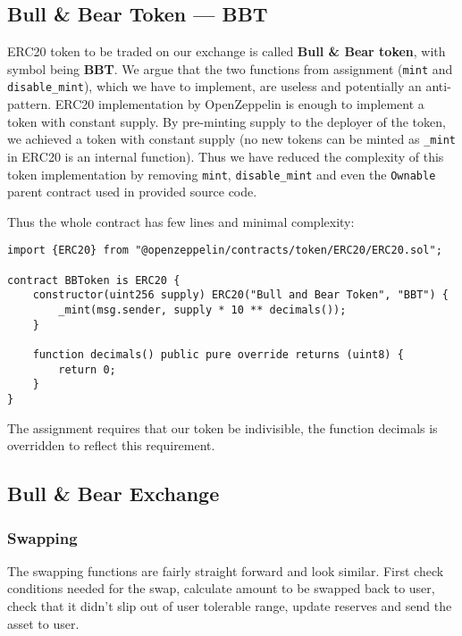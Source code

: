 \documentclass[11pt,a4paper]{article}
\begin{document}
\subsection*{Bull \& Bear Token --- BBT}

ERC20 token to be traded on our exchange is called \textbf{Bull \& Bear token},
with symbol being \textbf{BBT}. We argue that the two functions from assignment
(\texttt{mint} and \texttt{disable\_mint}), which we have to implement, are
useless and potentially an anti-pattern. ERC20 implementation by
OpenZeppelin is enough to implement a token with constant supply.
By pre-minting supply to the deployer of the token, we achieved a token
with constant supply (no new tokens can be minted as \texttt{\_mint} in ERC20
is an internal function\cite{openzeppelinERC20}). Thus we have reduced the
complexity of this token implementation by removing \texttt{mint}, \texttt{disable\_mint}
and even the \texttt{Ownable} parent contract used in provided source code.

Thus the whole contract has few lines and minimal complexity:

\begin{verbatim}
import {ERC20} from "@openzeppelin/contracts/token/ERC20/ERC20.sol";

contract BBToken is ERC20 {
    constructor(uint256 supply) ERC20("Bull and Bear Token", "BBT") {
        _mint(msg.sender, supply * 10 ** decimals());
    }

    function decimals() public pure override returns (uint8) {
        return 0;
    }
}
\end{verbatim}

The assignment requires that our token be indivisible, the function
decimals is overridden to reflect this requirement.

\subsection*{Bull \& Bear Exchange}

\subsubsection*{Swapping}

The swapping functions are fairly straight forward and look similar. First
check conditions needed for the swap, calculate amount to be swapped back
to user, check that it didn't slip out of user tolerable range, update reserves
and send the asset to user.
\end{document}
